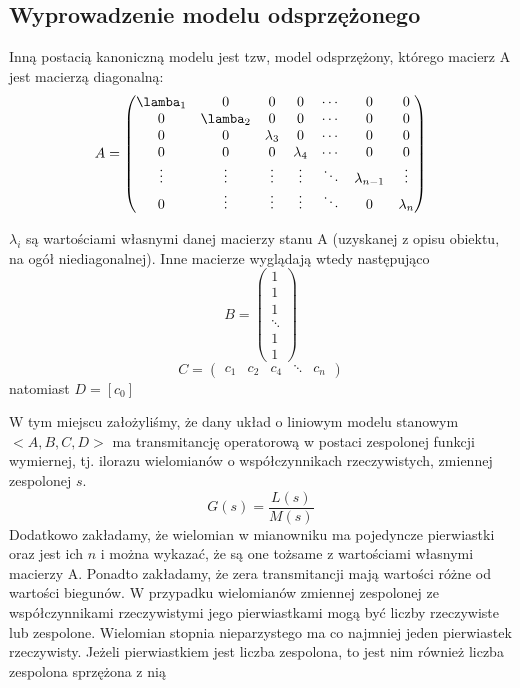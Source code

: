 \documentclass{article}
\begin{document}
		\subsection{Wyprowadzenie modelu odsprzężonego}
			Inną postacią kanoniczną modelu jest tzw, model odsprzężony, którego macierz A jest
			macierzą diagonalną:
			\begin{equation}
				A=\begin{pmatrix}
				  \lamba_1    &   0    &   0    &   0    & \cdots &   0    &   0      \\
				  0    &   \lamba_2    &   0    &   0    & \cdots &   0    &   0      \\
				  0    &   0    &   \lambda_3    &   0    & \cdots &   0    &   0      \\
				  0    &   0    &   0    &    \lambda_4   & \cdots &   0    &   0      \\
					\vdots & \vdots & \vdots & \vdots & \ddots & \lambda_{n-1} & \vdots   \\
				  0    & \vdots & \vdots & \vdots & \ddots &   0    & \lambda_n\\
				\end{pmatrix}
			\end{equation}

			$\lambda_i$ są wartościami własnymi danej macierzy stanu A (uzyskanej z opisu obiektu, na ogół niediagonalnej).
			Inne macierze wyglądają wtedy następująco	
			\begin{equation}
				B = 
				\begin{pmatrix}
					1 \\
					1 \\
					1 \\
					\ddots \\
					1 \\
					1 
				\end{pmatrix}
			\end{equation}
			\begin{equation}
				C = 
				\begin{pmatrix}
					c_1 & c_2 & c_4 & \ddots & c_n
				\end{pmatrix}
			\end{equation}
			natomiast $D = [c_0]$

			W tym miejscu założyliśmy, że dany układ o liniowym modelu stanowym $<A,B,C,D>$ ma
			transmitancję operatorową w postaci zespolonej funkcji wymiernej, tj. ilorazu
			wielomianów o współczynnikach rzeczywistych, zmiennej zespolonej $s$.
			\begin{equation}
				G(s) = \frac{L(s)}{M(s)}
			\end{equation}
			Dodatkowo zakładamy, że wielomian w mianowniku ma pojedyncze pierwiastki 
			oraz jest ich $n$ i można wykazać,
			że są one tożsame z wartościami własnymi macierzy A. Ponadto zakładamy, że zera
			transmitancji mają wartości różne od wartości biegunów.
			W przypadku wielomianów zmiennej zespolonej ze współczynnikami rzeczywistymi jego
			pierwiastkami mogą być liczby rzeczywiste lub zespolone. Wielomian stopnia
			nieparzystego ma co najmniej jeden pierwiastek rzeczywisty. Jeżeli pierwiastkiem jest
			liczba zespolona, to jest nim również liczba zespolona sprzężona z nią
\end{document}
